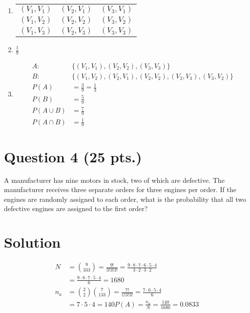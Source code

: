 \documentclass[11pt]{article}
\theoremstyle{definition}
\begin{document}
\begin{enumerate}
	\item
		\begin{table}[h]
			\centering
			\begin{tabular}{ccc}
				$(V_1, V_1)$ & $(V_2, V_1)$ & $(V_3, V_1)$ \\
				$(V_1, V_2)$ & $(V_2, V_2)$ & $(V_3, V_2)$ \\
				$(V_1, V_3)$ & $(V_2, V_3)$ & $(V_3, V_3)$ \\
			\end{tabular}
		\end{table}
	\item $\frac{1}{9}$
	\item
	$$
		\begin{aligned}
			A: & \{ (V_1, V_1), (V_2, V_2), (V_3, V_3) \} \\
			B: & \{ (V_1, V_2), (V_2, V_1), (V_2, V_2), (V_2, V_3), (V_3, V_2) \} \\
			P(A) & = \frac{3}{9} = \frac{1}{3} \\
			P(B) & = \frac{5}{9} \\
			P(A \cup B) & = \frac{7}{9} \\
			P(A \cap B) & = \frac{1}{9}
		\end{aligned}
	$$
\end{enumerate}

\newpage

\section*{Question 4 (25 pts.)}

A manufacturer has nine motors in stock, two of which are defective. The manufacturer receives three separate orders for three engines per order. If the engines are randomly assigned to each order, what is the probability that all two defective engines are assigned to the first order?

\section*{Solution}

$$
	\begin{aligned}
		N & = {9 \choose 3 3 3} = \frac{9!}{3!3!3!} = \frac{9 \cdot 8 \cdot 7 \cdot 6 \cdot 5 \cdot 4}{3 \cdot 2 \cdot 3 \cdot 2} \\
		& = \frac{9 \cdot 8 \cdot 7 \cdot 5 \cdot 4}{6} = 1680 \\
		n_a & = {2 \choose 2}{7 \choose 1 3 3} = \frac{7!}{1!3!3!} = \frac{7 \cdot 6 \cdot 5 \cdot 4}{6} \\
		& = 7 \cdot 5 \cdot 4 = 140
		P(A) = \frac{n_a}{N} = \frac{140}{1680} = 0.0833
	\end{aligned}
$$
\end{document}
